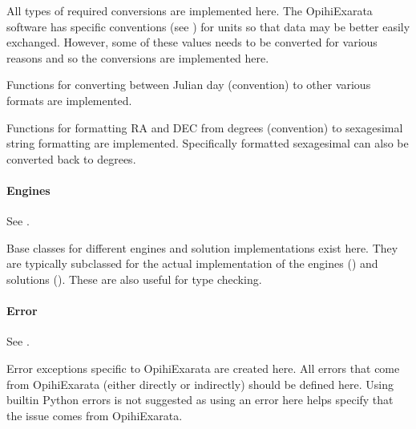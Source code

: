 \documentclass[letterpaper,11pt,english]{sphinxmanual}
\begin{document}
\sphinxAtStartPar
All types of required conversions are implemented here. The OpihiExarata
software has specific conventions (see {\hyperref[\detokenize{technical/conventions:technical-conventions}]{}}) for units
so that data may be better easily exchanged. However, some of these values
needs to be converted for various reasons and so the conversions are
implemented here.

\sphinxAtStartPar
Functions for converting between Julian day (convention) to other various
formats are implemented.

\sphinxAtStartPar
Functions for formatting RA and DEC from degrees (convention) to sexagesimal
string formatting are implemented. Specifically formatted sexagesimal can also
be converted back to degrees.


\paragraph{Engines}
\label{\detokenize{technical/architecture/library:engines}}
\sphinxAtStartPar
See {\hyperref[\detokenize{code/opihiexarata.library.engine:module-opihiexarata.library.engine}]{}}.

\sphinxAtStartPar
Base classes for different engines and solution implementations exist here.
They are typically subclassed for the actual implementation of the engines
({\hyperref[\detokenize{technical/architecture/services_engines:technical-architecture-services-engines}]{}}) and solutions
({\hyperref[\detokenize{technical/architecture/vehicles_solutions:technical-architecture-vehicles-solutions}]{}}). These are also useful for
type checking.


\paragraph{Error}
\label{\detokenize{technical/architecture/library:error}}
\sphinxAtStartPar
See {\hyperref[\detokenize{code/opihiexarata.library.error:module-opihiexarata.library.error}]{}}.

\sphinxAtStartPar
Error exceptions specific to OpihiExarata are created here. All errors that
come from OpihiExarata (either directly or indirectly) should be defined here.
Using built\sphinxhyphen{}in Python errors is not suggested as using an error here helps
specify that the issue comes from OpihiExarata.
\end{document}

